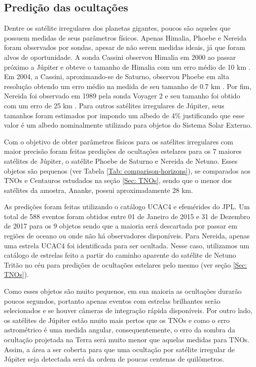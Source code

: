 \documentclass[12pt,a4paper]{monografia}
\begin{document}
\subsection{Prediç\~ao das ocultaç\~oes}
\label{Subsec: Irr-predic}

\indent \indent Dentre os satélite irregulares dos planetas gigantes, poucos são aqueles que possuem medidas de seus parâmetros físicos. Apenas Himalia, Phoebe e Nereida foram observados por sondas, apesar de não serem medidas ideais, já que foram alvos de oportunidade. A sonda Cassini observou Himalia em 2000 ao passar próximo a Júpiter e obteve o tamanho de Himalia com um erro médio de 10 km \citep{Porco2003}. Em 2004, a Cassini, aproximando-se de Saturno, observou Phoebe em alta resolução obtendo um erro médio na medida de seu tamanho de 0.7 km \citep{Thomas2010}. Por fim, Nereida foi observado em 1989 pela sonda Voyager 2 e seu tamanho foi obtido com um erro de 25 km \citep{Smith1989}. Para outros satélites irregulares de Júpiter, seus tamanhos foram estimados por \cite{Rettig2001} impondo um albedo de 4\% justificando que esse valor é um albedo nominalmente utilizado para objetos do Sistema Solar Externo.

Com o objetivo de obter parâmetros físicos para os satélites irregulares com maior precisão foram feitas predições de ocultações estelares para os 7 maiores satélites de Júpiter, o satélite Phoebe de Saturno e Nereida de Netuno. Esses objetos são pequenos (ver Tabela \ref{Tab: comparison-horizons}), se comparados aos TNOs e Centauros estudados na seção \ref{Sec: TNOs}, sendo que o menor dos satélites da amostra, Ananke, possui aproximadamente 28 km.

As predições foram feitas utilizando o catálogo UCAC4 e efemérides do JPL. Um total de 588 eventos foram obtidos entre 01 de Janeiro de 2015 e 31 de Dezembro de 2017 para os 9 objetos sendo que a maioria será descartada por passar em regiões de oceano ou onde não há observadores disponíveis. Para Nereida, apenas uma estrela UCAC4 foi identificada para ser ocultada. Nesse caso, utilizamos um catálogo de estrelas feito a partir do caminho aparente do satélite de Netuno Tritão no céu para predições de ocultações estelares pelo mesmo (ver seção \ref{Sec: TNOs}).

Como esses objetos são muito pequenos, em sua maioria as ocultações durarão poucos segundos, portanto apenas eventos com estrelas brilhantes serão selecionados e se houver câmeras de integração rápida disponíveis. Por outro lado, os satélites de Júpiter estão muito mais pertos que os TNOs e como o erro astrométrico é uma medida angular, consequentemente, o erro da sombra da ocultação projetada na Terra será muito menor que aquelas medidas para TNOs. Assim, a área a ser coberta para que uma ocultação por satélite irregular de Júpiter seja detectada será da ordem de poucas centenas de quilômetros.
\end{document}
